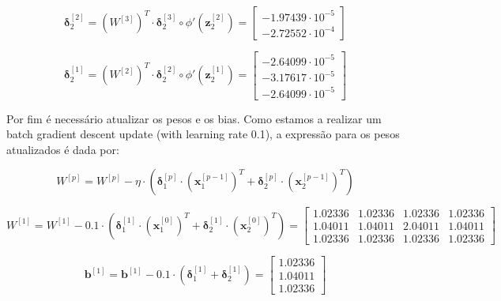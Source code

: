 \documentclass[a4paper,12pt]{article} %
\begin{document}
\begin{enumerate}
\begin{equation*}
    \bm{\delta}^{[2]}_2 = (W^{[3]})^T \cdot \bm{\delta}^{[3]}_2 \circ \phi'(\textbf{z}^{[2]}_2) = \begin{bmatrix} -1.97439\cdot 10^{-5} \\ -2.72552\cdot 10^{-4} \end{bmatrix}
\end{equation*}

\begin{equation*}
    \bm{\delta}^{[1]}_2 = (W^{[2]})^T \cdot \bm{\delta}^{[2]}_2 \circ \phi'(\textbf{z}^{[1]}_2) = \begin{bmatrix} -2.64099\cdot 10^{-5} \\ -3.17617\cdot 10^{-5} \\ -2.64099\cdot 10^{-5} \end{bmatrix}
\end{equation*}

Por fim é necessário atualizar os pesos e os bias. Como estamos a realizar um batch gradient descent update (with learning rate 0.1), a expressão para os pesos atualizados é dada por:

\begin{equation*}
    W^{[p]} = W^{[p]} - \eta \cdot (\bm{\delta}^{[p]}_1 \cdot (\textbf{x}^{[p-1]}_1)^T + \bm{\delta}^{[p]}_2 \cdot (\textbf{x}^{[p-1]}_2)^T)
\end{equation*}

\begin{equation*}
    W^{[1]} = W^{[1]} - 0.1 \cdot (\bm{\delta}^{[1]}_1 \cdot (\textbf{x}^{[0]}_1)^T + \bm{\delta}^{[1]}_2 \cdot (\textbf{x}^{[0]}_2)^T) = \begin{bmatrix} 1.02336 & 1.02336 & 1.02336 & 1.02336 \\
                                                                                                                            1.04011 & 1.04011 & 2.04011 & 1.04011 \\
                                                                                                                            1.02336 & 1.02336 & 1.02336 & 1.02336 \end{bmatrix}
\end{equation*}

\begin{equation*}
    \textbf{b}^{[1]} = \textbf{b}^{[1]} - 0.1 \cdot (\bm{\delta}^{[1]}_1 + \bm{\delta}^{[1]}_2) = \begin{bmatrix} 1.02336 \\ 1.04011 \\ 1.02336 \end{bmatrix}
\end{equation*}


\end{enumerate}
\end{document}
